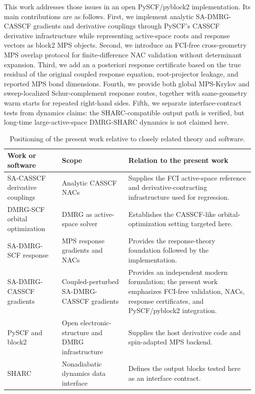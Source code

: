 \documentclass[journal=jctcce,manuscript=article]{achemso}
\begin{document}
This work addresses those issues in an open PySCF/pyblock2 implementation.
Its main contributions are as follows.
First, we implement analytic SA-DMRG-CASSCF gradients and derivative couplings through PySCF's CASSCF derivative infrastructure while representing active-space roots and response vectors as block2 MPS objects.
Second, we introduce an FCI-free cross-geometry MPS overlap protocol for finite-difference NAC validation without determinant expansion.
Third, we add an a posteriori response certificate based on the true residual of the original coupled response equation, root-projector leakage, and reported MPS bond dimensions.
Fourth, we provide both global MPS-Krylov and sweep-localized Schur-complement response routes, together with same-geometry warm starts for repeated right-hand sides.
Fifth, we separate interface-contract tests from dynamics claims: the SHARC-compatible output path is verified, but long-time large-active-space DMRG-SHARC dynamics is not claimed here.

\begin{table}[t]
\centering
\small
\caption{Positioning of the present work relative to closely related theory and software.}
\label{tab:positioning}
\begin{tabular}{P{0.24\textwidth}P{0.25\textwidth}P{0.42\textwidth}}
\toprule
Work or software & Scope & Relation to the present work \\
\midrule
SA-CASSCF derivative couplings\cite{FdezGalvan2016} & Analytic CASSCF NACs & Supplies the FCI active-space reference and derivative-contracting infrastructure used for regression. \\
DMRG-SCF orbital optimization\cite{ZgidNooijen2008,Ghosh2008} & DMRG as active-space solver & Establishes the CASSCF-like orbital-optimization setting targeted here. \\
SA-DMRG-SCF response\cite{Freitag2019} & MPS response gradients and NACs & Provides the response-theory foundation followed by the implementation. \\
SA-DMRG-CASSCF gradients\cite{Iino2023} & Coupled-perturbed SA-DMRG-CASSCF gradients & Provides an independent modern formulation; the present work emphasizes FCI-free validation, NACs, response certificates, and PySCF/pyblock2 integration. \\
PySCF and block2\cite{Sun2018PySCF,Sun2020PySCF,Zhai2023Block2} & Open electronic-structure and DMRG infrastructure & Supplies the host derivative code and spin-adapted MPS backend. \\
SHARC\cite{Richter2011SHARC,Mai2018SHARC} & Nonadiabatic dynamics data interface & Defines the output blocks tested here as an interface contract. \\
\bottomrule
\end{tabular}
\end{table}
\end{document}
